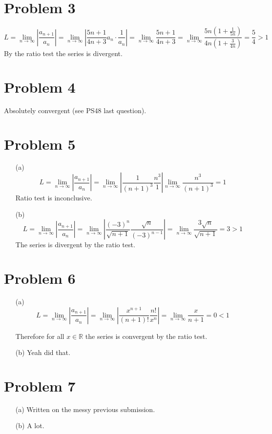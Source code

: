\documentclass[preview, margin=0.6in]{standalone}
\newcommand*{\problem}[1]{\section*{Problem #1}}
\begin{document}
\problem{3}
\begin{equation*}
	L 
	=\lim_{n\to\infty}\left|\frac{a_{n+1}}{a_n}\right|
	=\lim_{n\to\infty}\left|\frac{5n+1}{4n+3}a_n\cdot \frac{1}{a_n}\right|
	=\lim_{n\to\infty}\frac{5n+1}{4n+3}
	=\lim_{n\to\infty}\frac{5n \left(1+\frac{1}{5n}\right)}{4n \left(1+\frac{3}{4n}\right)}
	=\frac54>1
\end{equation*}
By the ratio test the series is divergent.

\problem{4}
Absolutely convergent (see PS48 last question).

\problem{5}
\begin{itemize}
	\item[(a)]
		\begin{equation*}
		    L 
			=\lim_{n\to\infty}\left|\frac{a_{n+1}}{a_n}\right|
			=\lim_{n\to\infty}\left|\frac{1}{(n+1)^3}\frac{n^3}{1}\right|
			\lim_{n\to\infty}\frac{n^3}{(n+1)^3}
			=1
		\end{equation*}
		Ratio test is inconclusive.

	\item[(b)]
		\begin{equation*}
		    L 
			=\lim_{n\to\infty}\left|\frac{a_{n+1}}{a_n}\right|
			=\lim_{n\to\infty}\left|\frac{(-3)^{n}}{\sqrt{n+1}}\frac{\sqrt{n}}{(-3)^{n-1}}\right|
			=\lim_{n\to\infty}\frac{3 \sqrt{n}}{\sqrt{n+1}}
			=3>1
		\end{equation*}
		The series is divergent by the ratio test.
\end{itemize}

\problem{6}
\begin{itemize}
\item[(a)]
	\begin{equation*}
		L 
		=\lim_{n\to\infty}\left|\frac{a_{n+1}}{a_n}\right|
		=\lim_{n\to\infty}\left|\frac{x^{n+1}}{(n+1)!}\frac{n!}{x^n}\right|
		=\lim_{n\to\infty}\frac{x}{n+1}
		=0<1
	\end{equation*}

	Therefore for all $x\in\mathbb R$ the series is convergent by the ratio test.

\item[(b)]
	Yeah did that.
\end{itemize}

\problem{7}
\begin{itemize}
	\item[(a)] Written on the messy previous submission.
	\item[(b)] A lot.
\end{itemize}
\end{document}
